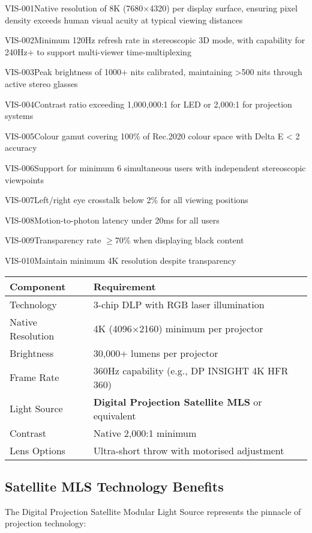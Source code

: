 \begin{requirement}{VIS-001}{Native resolution of 8K (7680×4320) per display surface, ensuring pixel density exceeds human visual acuity at typical viewing distances}
\begin{requirement}{VIS-002}{Minimum 120Hz refresh rate in stereoscopic 3D mode, with capability for 240Hz+ to support multi-viewer time-multiplexing}
\begin{requirement}{VIS-003}{Peak brightness of 1000+ nits calibrated, maintaining >500 nits through active stereo glasses}
\begin{requirement}{VIS-004}{Contrast ratio exceeding 1,000,000:1 for LED or 2,000:1 for projection systems}
\begin{requirement}{VIS-005}{Colour gamut covering 100\% of Rec.2020 colour space with Delta E < 2 accuracy}
\begin{requirement}{VIS-006}{Support for minimum 6 simultaneous users with independent stereoscopic viewpoints}
\begin{requirement}{VIS-007}{Left/right eye crosstalk below 2\% for all viewing positions}
\begin{requirement}{VIS-008}{Motion-to-photon latency under 20ms for all users}
\begin{requirement}{VIS-009}{Transparency rate $\ge$70\% when displaying black content}
\begin{requirement}{VIS-010}{Maintain minimum 4K resolution despite transparency}
\begin{table}[H]
\centering
\begin{tabularx}{\textwidth}{@{}lX@{}}
\toprule
\textbf{Component} & \textbf{Requirement} \\
\midrule
Technology & 3-chip DLP with RGB laser illumination \\
Native Resolution & 4K (4096×2160) minimum per projector \\
Brightness & 30,000+ lumens per projector \\
Frame Rate & 360Hz capability (e.g., DP INSIGHT 4K HFR 360) \\
Light Source & \textbf{Digital Projection Satellite MLS} or equivalent \\
Contrast & Native 2,000:1 minimum \\
Lens Options & Ultra-short throw with motorised adjustment \\
\bottomrule
\end{tabularx}
\end{table}

\subsection{Satellite MLS Technology Benefits}

The Digital Projection Satellite Modular Light Source represents the pinnacle of projection technology:

\begin{figure}[H]
\centering
{}
\end{figure}
\end{requirement}
\end{requirement}
\end{requirement}
\end{requirement}
\end{requirement}
\end{requirement}
\end{requirement}
\end{requirement}
\end{requirement}
\end{requirement}
